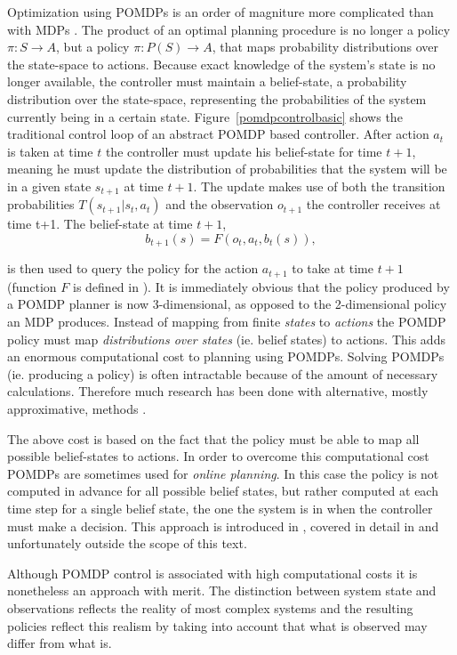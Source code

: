 Optimization using POMDPs is an order of magniture more complicated than with MDPs \cite{mdpai}\cite{littman96}. The product of an optimal planning procedure is no longer a policy $\pi: S \rightarrow A$, but a policy $\pi: P(S) \rightarrow A$, that maps probability distributions over the state-space to actions. Because exact knowledge of the system's state is no longer available, the controller must maintain a belief-state, a probability distribution over the state-space, representing the probabilities of the system currently being in a certain state. Figure~\ref{pomdpcontrolbasic} shows the traditional control loop of an abstract POMDP based controller. After action $a_t$ is taken at time $t$ the controller must update his belief-state for time $t+1$, meaning he must update the distribution of probabilities that the system will be in a given state $s_{t+1}$ at time $t+1$. The update makes use of both the transition probabilities $T(s_{t+1}|s_t,a_t)$ and the observation $o_{t+1}$ the controller receives at time {t+1}. The belief-state at time $t+1$,
\[
b_{t+1}(s) = F(o_t,a_t,b_t(s)),
\]

is then used to query the policy for the action $a_{t+1}$ to take at time $t+1$ (function $F$ is defined in \cite{mdpai}). It is immediately obvious that the policy produced by a POMDP planner is now 3-dimensional, as opposed to the 2-dimensional policy an MDP produces. Instead of mapping from finite \textit{states} to \textit{actions} the POMDP policy must map \textit{distributions over states} (ie. belief states) to actions. This adds an enormous computational cost to planning using POMDPs. Solving POMDPs (ie. producing a policy) is often intractable because of the amount of necessary calculations. Therefore much research has been done with alternative, mostly approximative, methods \cite{Hansen98}\cite{littman96}.

The above cost is based on the fact that the policy must be able to map all possible belief-states to actions. In order to overcome this computational cost POMDPs are sometimes used for \textit{online planning}. In this case the policy is not computed in advance for all possible belief states, but rather computed at each time step for a single belief state, the one the system is in when the controller must make a decision. This approach is introduced in \cite{mdpai}, covered in detail in \cite{ross2008online} and unfortunately outside the scope of this text.

Although POMDP control is associated with high computational costs it is nonetheless an approach with merit. The distinction between system state and observations reflects the reality of most complex systems and the resulting policies reflect this realism by taking into account that what is observed may differ from what is.

